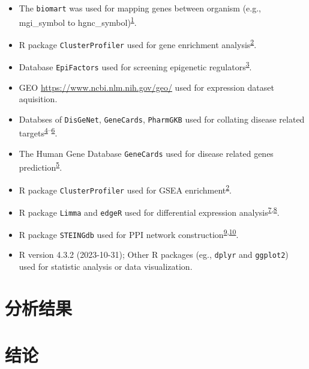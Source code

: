 \documentclass[
]{article}
\providecommand{\tightlist}{%
  \setlength{\itemsep}{0pt}\setlength{\parskip}{0pt}}
\begin{document}
\begin{itemize}
\tightlist
\item
  The \texttt{biomart} was used for mapping genes between organism (e.g., mgi\_symbol to hgnc\_symbol)\textsuperscript{\protect\hyperlink{ref-MappingIdentifDurinc2009}{1}}.
\item
  R package \texttt{ClusterProfiler} used for gene enrichment analysis\textsuperscript{\protect\hyperlink{ref-ClusterprofilerWuTi2021}{2}}.
\item
  Database \texttt{EpiFactors} used for screening epigenetic regulators\textsuperscript{\protect\hyperlink{ref-Epifactors2022Maraku2023}{3}}.
\item
  GEO \url{https://www.ncbi.nlm.nih.gov/geo/} used for expression dataset aquisition.
\item
  Databses of \texttt{DisGeNet}, \texttt{GeneCards}, \texttt{PharmGKB} used for collating disease related targets\textsuperscript{\protect\hyperlink{ref-TheDisgenetKnPinero2019}{4}--\protect\hyperlink{ref-PharmgkbAWorBarbar2018}{6}}.
\item
  The Human Gene Database \texttt{GeneCards} used for disease related genes prediction\textsuperscript{\protect\hyperlink{ref-TheGenecardsSStelze2016}{5}}.
\item
  R package \texttt{ClusterProfiler} used for GSEA enrichment\textsuperscript{\protect\hyperlink{ref-ClusterprofilerWuTi2021}{2}}.
\item
  R package \texttt{Limma} and \texttt{edgeR} used for differential expression analysis\textsuperscript{\protect\hyperlink{ref-LimmaPowersDiRitchi2015}{7},\protect\hyperlink{ref-EdgerDifferenChen}{8}}.
\item
  R package \texttt{STEINGdb} used for PPI network construction\textsuperscript{\protect\hyperlink{ref-TheStringDataSzklar2021}{9},\protect\hyperlink{ref-CytohubbaIdenChin2014}{10}}.
\item
  R version 4.3.2 (2023-10-31); Other R packages (eg., \texttt{dplyr} and \texttt{ggplot2}) used for statistic analysis or data visualization.
\end{itemize}

\hypertarget{results}{%
\section{分析结果}\label{results}}

\hypertarget{dis}{%
\section{结论}\label{dis}}
\end{document}
